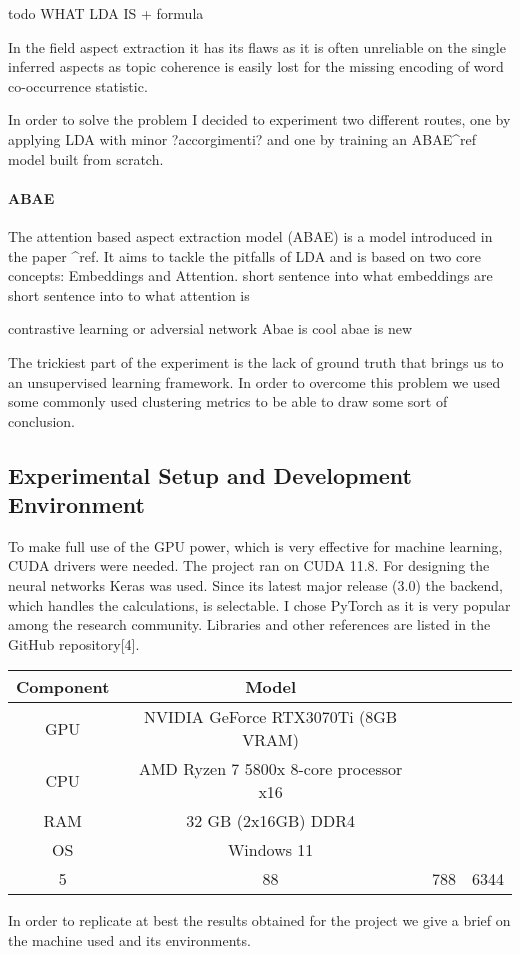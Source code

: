 todo WHAT LDA IS + formula


In the field aspect extraction it has its flaws as it is often unreliable on the single inferred aspects
as topic coherence is easily lost for the missing encoding of word co-occurrence statistic.

In order to solve the problem I decided to experiment two different routes, one by applying LDA with minor ?accorgimenti?
and one by training an ABAE^ref model built from scratch.

\paragraph{ABAE} The attention based aspect extraction model (ABAE) is a model introduced in the paper ^ref.
It aims to tackle the pitfalls of LDA and is based on two core concepts: Embeddings and Attention.
short sentence into what embeddings are
short sentence into to what attention is

contrastive learning or adversial network
Abae is cool abae is new


The trickiest part of the experiment is the lack of ground truth that brings us to an unsupervised learning framework.
In order to overcome this problem we used some commonly used clustering metrics to be able to draw some sort of conclusion.



\subsection{Experimental Setup and Development Environment}
To make full use of the GPU power, which is very effective for machine learning, CUDA drivers were needed.
The project ran on CUDA 11.8.
For designing the neural networks Keras was used.
Since its latest major release (3.0) the backend, which handles the calculations, is selectable.
I chose PyTorch as it is very popular among the research community.
Libraries and other references are listed in the GitHub repository[4].

\begin{center}
    \begin{tabular}{||c c c c||}
        \hline
        Component & Model \\ [0.5ex]
        \hline\hline
        GPU & NVIDIA GeForce RTX3070Ti (8GB VRAM) \\
        \hline
        CPU & AMD Ryzen 7 5800x 8-core processor x16 \\
        \hline
        RAM & 32 GB (2x16GB) DDR4 \\
        \hline
        OS & Windows 11 \\
        \hline
        5 & 88 & 788 & 6344 \\ [1ex]
        \hline
    \end{tabular}
\end{center}

In order to replicate at best the results obtained for the project we give a brief
on the machine used and its environments.


